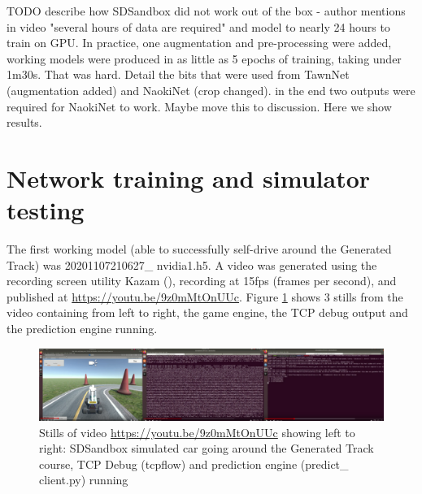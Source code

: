 TODO describe how SDSandbox did not work out of the box - author mentions in video "several hours of data are required" and model to nearly 24 hours to train on GPU. In practice, one augmentation and pre-processing were added, working models were produced in as little as 5 epochs of training, taking under 1m30s.
That was hard. Detail the bits that were used from TawnNet (augmentation added) and NaokiNet (crop changed). in the end two outputs were required for NaokiNet to work. Maybe move this to discussion. Here we show results.


\section{Network training and simulator testing}
\label{results:net-training} 
The first working model (able to successfully self-drive around the Generated Track) was 20201107210627\_ nvidia1.h5. A video was generated using the recording screen utility Kazam (\cite{Kazam2020}), recording at 15fps (frames per second), and published at  \href{https://youtu.be/9z0mMtOnUUc}{https://youtu.be/9z0mMtOnUUc}. Figure \ref{fig:SimTCPPred}
shows 3 stills from the video containing from left to right, the game engine, the TCP debug output and the prediction engine running.

\begin{figure}[h!]
\centering
\includegraphics[width=\textwidth]{Figures/SimTCPPred.png}
\caption{Stills of video \href{https://youtu.be/9z0mMtOnUUc}{https://youtu.be/9z0mMtOnUUc} showing left to right: SDSandbox simulated car going around the Generated Track course, TCP Debug (tcpflow) and prediction engine (predict\_ client.py) running}
\label{fig:SimTCPPred}
\end{figure}

